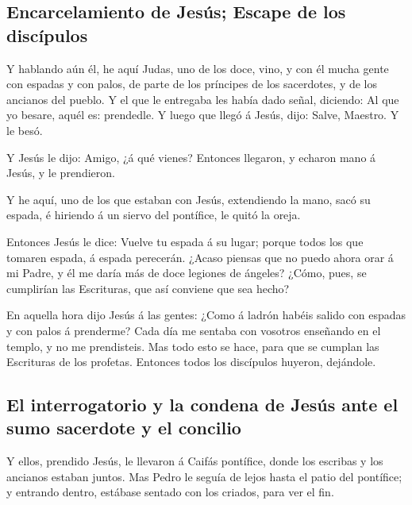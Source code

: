 \hypertarget{encarcelamiento-de-jesuxfas-escape-de-los-discuxedpulos}{%
\subsection{Encarcelamiento de Jesús; Escape de los
discípulos}\label{encarcelamiento-de-jesuxfas-escape-de-los-discuxedpulos}}

 Y hablando aún él, he aquí Judas, uno de los doce, vino, y
con él mucha gente con espadas y con palos, de parte de los príncipes de
los sacerdotes, y de los ancianos del pueblo.  Y el que le
entregaba les había dado señal, diciendo: Al que yo besare, aquél es:
prendedle.  Y luego que llegó á Jesús, dijo: Salve,
Maestro. Y le besó.

 Y Jesús le dijo: Amigo, ¿á qué vienes? Entonces llegaron,
y echaron mano á Jesús, y le prendieron.

 Y he aquí, uno de los que estaban con Jesús, extendiendo
la mano, sacó su espada, é hiriendo á un siervo del pontífice, le quitó
la oreja.

 Entonces Jesús le dice: Vuelve tu espada á su lugar;
porque todos los que tomaren espada, á espada perecerán. 
¿Acaso piensas que no puedo ahora orar á mi Padre, y él me daría más de
doce legiones de ángeles?  ¿Cómo, pues, se cumplirían las
Escrituras, que así conviene que sea hecho?

 En aquella hora dijo Jesús á las gentes: ¿Como á ladrón
habéis salido con espadas y con palos á prenderme? Cada día me sentaba
con vosotros enseñando en el templo, y no me prendisteis. 
Mas todo esto se hace, para que se cumplan las Escrituras de los
profetas. Entonces todos los discípulos huyeron, dejándole.

\hypertarget{el-interrogatorio-y-la-condena-de-jesuxfas-ante-el-sumo-sacerdote-y-el-concilio}{%
\subsection{El interrogatorio y la condena de Jesús ante el sumo
sacerdote y el
concilio}\label{el-interrogatorio-y-la-condena-de-jesuxfas-ante-el-sumo-sacerdote-y-el-concilio}}

 Y ellos, prendido Jesús, le llevaron á Caifás pontífice,
donde los escribas y los ancianos estaban juntos.  Mas
Pedro le seguía de lejos hasta el patio del pontífice; y entrando
dentro, estábase sentado con los criados, para ver el fin.

